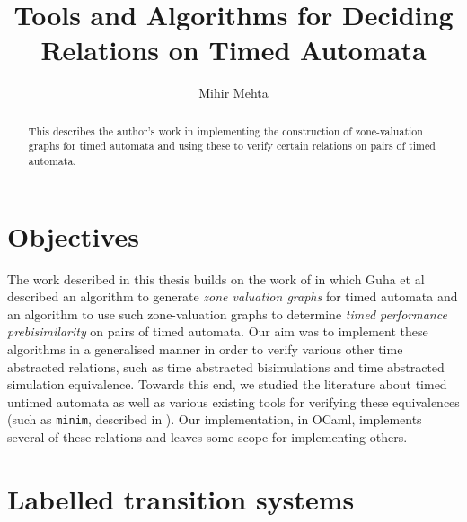 \documentclass[a4paper]{llncs}
\begin{document}
\mainmatter

\title{Tools and Algorithms for Deciding Relations on Timed Automata}

\author{Mihir Mehta}



\maketitle

\begin{abstract}
  This describes the author's work in implementing the construction of
  zone-valuation graphs for timed automata and using these to verify
  certain relations on pairs of timed automata.
\end{abstract}
\pagebreak

\tableofcontents
\pagebreak
\listoffigures
\listoftables
\pagebreak

\section{Objectives}

The work described in this thesis builds on the work of
\cite{DBLP:conf/cav/GuhaNA12} in which Guha et al described an
algorithm to generate \emph{zone valuation graphs} for timed automata
and an algorithm to use such zone-valuation graphs to determine
\emph{timed performance prebisimilarity} on pairs of timed
automata. Our aim was to implement these algorithms in a generalised
manner in order to verify various other time abstracted relations,
such as time abstracted bisimulations \cite{tripakis2001analysis} and
time abstracted simulation equivalence. Towards
this end, we studied the literature about timed
untimed automata as well as various existing tools for verifying these
equivalences (such as \texttt{minim}, described in
\cite{tripakis2001analysis}). Our implementation, in OCaml, implements
several of these relations and leaves some scope for implementing others.

\section{Labelled transition systems}
\end{document}
